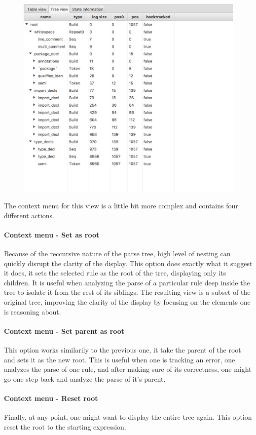 	\bigskip

	\begin{figure}[h]
		\centering
		\includegraphics[width=.7\textwidth] {ressources/treeview}
		\caption{} 
		\label{fig:treeview}
	\end{figure}

	The context menu for this view is a little bit more complex and contains four different actions.
	\paragraph{Context menu - Set as root} Because of the reccursive nature of the parse tree, high level of nesting can quickly disrupt the clarity of the display. This option does exactly what it suggest it does, it sets the selected rule as the root of the tree, displaying only its children. It is useful when analyzing the parse of a particular rule deep inside the tree to isolate it from the rest of its siblings. The resulting view is a subset of the original tree, improving the clarity of the display by focusing on the elements one is reasoning about.

	\paragraph{Context menu - Set parent as root} This option works similarily to the previous one, it take the parent of the root and sets it as the new root. This is useful when one is tracking an error, one analyzes the parse of one rule, and after making sure of its correctness, one might go one step back and analyze the parse of it's parent.

	\paragraph{Context menu - Reset root} Finally, at any point, one might want to display the entire tree again. This option reset the root to the starting expression.

